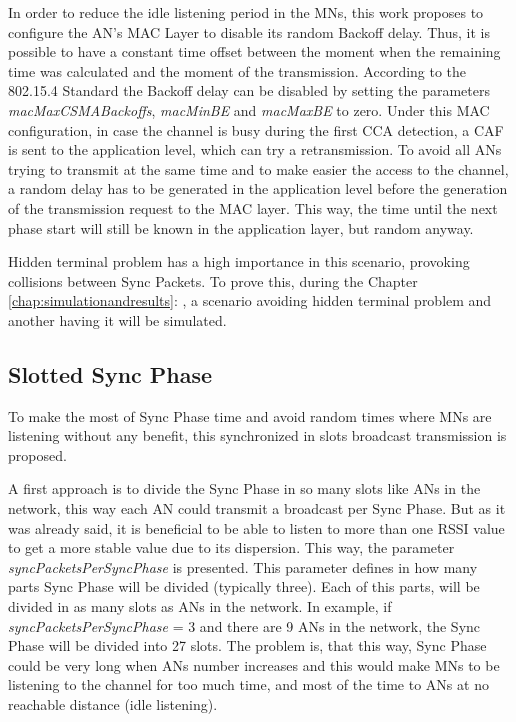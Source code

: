 In order to reduce the idle listening period in the \acp{MN}, this work proposes to configure the \ac{AN}'s \ac{MAC} Layer to disable its random 
Backoff delay. Thus, it is possible to have a constant time offset between the moment when the remaining time was calculated and the moment of the 
transmission. According to the 802.15.4 Standard the Backoff delay can be disabled by setting the parameters \textit{macMaxCSMABackoffs}, 
\textit{macMinBE} and \textit{macMaxBE} 
to zero. Under this \ac{MAC} configuration, in case the channel is busy during the first \ac{CCA} detection, a \ac{CAF} is sent to the application 
level, which can try a retransmission. To avoid all \acp{AN} trying to transmit at the same time and to make easier the access to the channel, a random 
delay has to be generated in the application level before the generation of the transmission request to the \ac{MAC} layer. This way, the time until
the next phase start will still be known in the application layer, but random anyway. 

Hidden terminal problem has a high importance in this scenario, provoking collisions between Sync Packets. To prove this, during the Chapter 
\ref{chap:simulationandresults}: , a scenario avoiding hidden terminal problem and another having it will be simulated.

\subsection{Slotted Sync Phase}

To make the most of Sync Phase time and avoid random times where \acp{MN} are listening without any benefit, this synchronized in slots broadcast 
transmission is proposed.

A first approach is to divide the Sync Phase in so many slots like \acp{AN} in the network, this way each \ac{AN} could transmit a broadcast per Sync Phase.
But as it was already said, it is beneficial to be able to listen to more than one \ac{RSSI} value to get a more stable value due to its dispersion. This
way, the parameter \textit{syncPacketsPerSyncPhase} is presented. This parameter defines in how many parts Sync Phase will be divided (typically three). Each of 
this parts, will be divided in as many slots as \acp{AN} in the network. In example, if \textit{syncPacketsPerSyncPhase} = 3 and there are 9 \acp{AN} in the 
network, the Sync Phase will be divided into 27 slots. The problem is, that this way, Sync Phase could be very long when \acp{AN} number increases and this would make
\acp{MN} to be listening to the channel for too much time, and most of the time to \acp{AN} at no reachable distance (idle listening).

